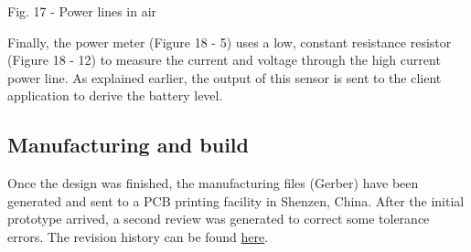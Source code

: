 \documentclass{IEEEtran}
\begin{document}
\begin{it}\begin{center}Fig. 17 - Power lines in air \end{center}\end{it}
Finally, the power meter (Figure 18 - 5) uses a low, constant resistance resistor (Figure 18 - 12) to measure the current and voltage through the high current power line. As explained earlier, the output of this sensor is sent to the client application to derive the battery level.
\subsection*{Manufacturing and build}
Once the design was finished, the manufacturing files (Gerber) have been generated and sent to a PCB printing facility in Shenzen, China. After the initial prototype arrived, a second review was generated to correct some tolerance errors. The revision history can be found \hyperlink{https://easyeda.com/be.mihai22/project-hawk}{here}.
\clearpage
\pagebreak
\end{document}
